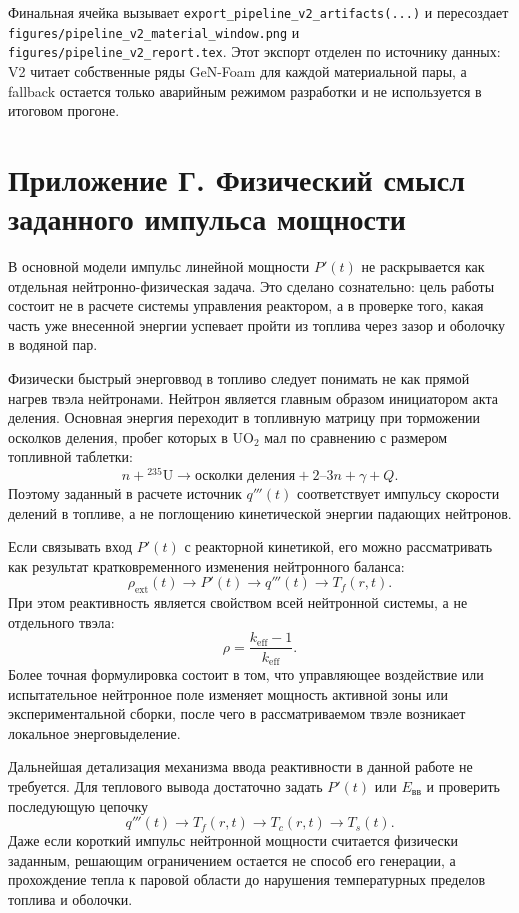 \documentclass[12pt]{article}
\begin{document}
Финальная ячейка вызывает \texttt{export\_pipeline\_v2\_artifacts(...)} и пересоздает \texttt{figures/pipeline\_v2\_material\_window.png} и \texttt{figures/pipeline\_v2\_report.tex}. Этот экспорт отделен по источнику данных: V2 читает собственные ряды GeN-Foam для каждой материальной пары, а fallback остается только аварийным режимом разработки и не используется в итоговом прогоне.

\newpage
\section*{Приложение Г. Физический смысл заданного импульса мощности}

В основной модели импульс линейной мощности \(P'(t)\) не раскрывается как отдельная нейтронно-физическая задача. Это сделано сознательно: цель работы состоит не в расчете системы управления реактором, а в проверке того, какая часть уже внесенной энергии успевает пройти из топлива через зазор и оболочку в водяной пар.

Физически быстрый энерговвод в топливо следует понимать не как прямой нагрев твэла нейтронами. Нейтрон является главным образом инициатором акта деления. Основная энергия переходит в топливную матрицу при торможении осколков деления, пробег которых в \(\mathrm{UO_2}\) мал по сравнению с размером топливной таблетки:
\[
n+{}^{235}\mathrm U
\rightarrow
\text{осколки деления}+2\text{--}3n+\gamma+Q.
\]
Поэтому заданный в расчете источник \(q'''(t)\) соответствует импульсу скорости делений в топливе, а не поглощению кинетической энергии падающих нейтронов.

Если связывать вход \(P'(t)\) с реакторной кинетикой, его можно рассматривать как результат кратковременного изменения нейтронного баланса:
\[
\rho_{\mathrm{ext}}(t)\rightarrow P'(t)\rightarrow q'''(t)\rightarrow T_f(r,t).
\]
При этом реактивность является свойством всей нейтронной системы, а не отдельного твэла:
\[
\rho=\frac{k_{\mathrm{eff}}-1}{k_{\mathrm{eff}}}.
\]
Более точная формулировка состоит в том, что управляющее воздействие или испытательное нейтронное поле изменяет мощность активной зоны или экспериментальной сборки, после чего в рассматриваемом твэле возникает локальное энерговыделение.

Дальнейшая детализация механизма ввода реактивности в данной работе не требуется. Для теплового вывода достаточно задать \(P'(t)\) или \(E_{\mathrm{вв}}\) и проверить последующую цепочку
\[
q'''(t)\rightarrow T_f(r,t)\rightarrow T_c(r,t)\rightarrow T_s(t).
\]
Даже если короткий импульс нейтронной мощности считается физически заданным, решающим ограничением остается не способ его генерации, а прохождение тепла к паровой области до нарушения температурных пределов топлива и оболочки.
\end{document}
